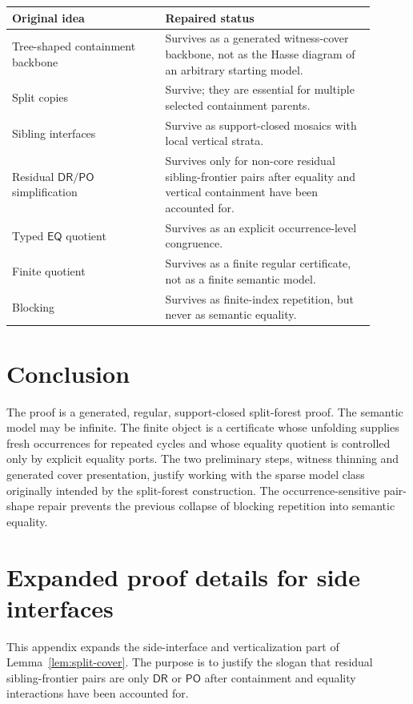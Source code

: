 \documentclass[11pt]{article}
\newcommand{\EQ}{\mathsf{EQ}}
\newcommand{\DR}{\mathsf{DR}}
\newcommand{\PO}{\mathsf{PO}}
\begin{document}
\begin{center}
\begin{tabular}{p{0.38\linewidth}p{0.52\linewidth}}
\toprule
Original idea & Repaired status \\
\midrule
Tree-shaped containment backbone & Survives as a generated witness-cover backbone, not as the Hasse diagram of an arbitrary starting model. \\
Split copies & Survive; they are essential for multiple selected containment parents. \\
Sibling interfaces & Survive as support-closed mosaics with local vertical strata. \\
Residual $\DR/\PO$ simplification & Survives only for non-core residual sibling-frontier pairs after equality and vertical containment have been accounted for. \\
Typed $\EQ$ quotient & Survives as an explicit occurrence-level congruence. \\
Finite quotient & Survives as a finite regular certificate, not as a finite semantic model. \\
Blocking & Survives as finite-index repetition, but never as semantic equality. \\
\bottomrule
\end{tabular}
\end{center}

\section{Conclusion}

The proof is a generated, regular, support-closed split-forest proof.  The semantic model may be infinite.  The finite object is a certificate whose unfolding supplies fresh occurrences for repeated cycles and whose equality quotient is controlled only by explicit equality ports.  The two preliminary steps, witness thinning and generated cover presentation, justify working with the sparse model class originally intended by the split-forest construction.  The occurrence-sensitive pair-shape repair prevents the previous collapse of blocking repetition into semantic equality.


\appendix

\section{Expanded proof details for side interfaces}

This appendix expands the side-interface and verticalization part of Lemma~\ref{lem:split-cover}.  The purpose is to justify the slogan that residual sibling-frontier pairs are only $\DR$ or $\PO$ after containment and equality interactions have been accounted for.
\end{document}
